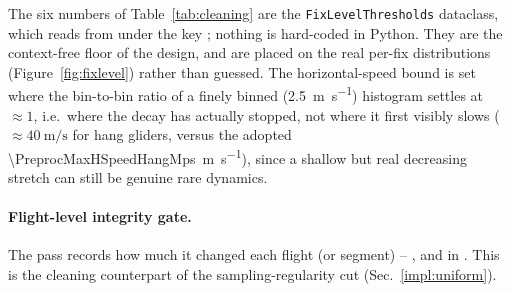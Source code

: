 \subsubsection{}
The six numbers of
Table~\ref{tab:cleaning} are the \texttt{FixLevelThresholds} dataclass, which
 reads from  under the key
; nothing is hard-coded in Python.
They are the context-free floor of the design, and are placed on the real per-fix
distributions (Figure~\ref{fig:fixlevel}) rather than guessed. The horizontal-speed bound is
set where the bin-to-bin ratio of a finely binned (\SI{2.5}{\metre\per\second}) histogram
settles at $\approx 1$, i.e.\ where the decay has actually stopped, not where it first visibly
slows ($\approx\SI{40}{\metre\per\second}$ for hang gliders, versus the adopted
\SI{\PreprocMaxHSpeedHangMps}{\metre\per\second}), since a shallow but real decreasing stretch can still be genuine
rare dynamics. 

\paragraph{Flight-level integrity gate.} The pass records how much it changed each flight (or
segment) -- ,  and  in
.  This is the
cleaning counterpart of the sampling-regularity
cut (Sec.~\ref{impl:uniform}).

